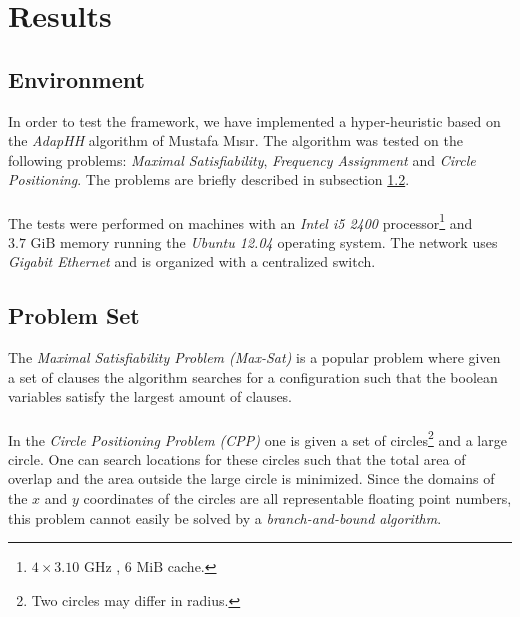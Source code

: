 \documentclass[a4paper,10pt]{article}
\newcommand{\seclab}[1]{\label{sec:#1}}
\newcommand{\ssclab}[1]{\label{ssc:#1}}
\newcommand{\sscref}[1]{\ref{ssc:#1}}
\theoremstyle{definition}
\begin{document}
\section{Results}
\seclab{results}

\subsection{Environment}
In order to test the framework, we have implemented a hyper-heuristic based on the \emph{AdapHH}\cite{} algorithm of Mustafa M\i{}s\i{}r. The algorithm was tested on the following problems: \emph{Maximal Satisfiability}, \emph{Frequency Assignment} and \emph{Circle Positioning}. The problems are briefly described in subsection \sscref{problemset}.%
\paragraph{}
The tests were performed on machines with an \emph{Intel i5 2400} processor\footnote{$4\times 3.10\mbox{ GHz}$ , $6\mbox{ MiB}$ cache.} and $3.7\mbox{ GiB}$ memory running the \emph{Ubuntu 12.04} operating system. The network uses \emph{Gigabit Ethernet} and is organized with a centralized switch.

\subsection{Problem Set}
\ssclab{problemset}
The \emph{Maximal Satisfiability Problem (Max-Sat)} is a popular problem where given a set of clauses the algorithm searches for a configuration such that the boolean variables satisfy the largest amount of clauses.

\paragraph{}
In the \emph{Circle Positioning Problem (CPP)} one is given a set of circles\footnote{Two circles may differ in radius.} and a large circle. One can search locations for these circles such that the total area of overlap and the area outside the large circle is minimized. Since the domains of the $x$ and $y$ coordinates of the circles are all representable floating point numbers, this problem cannot easily be solved by a \emph{branch-and-bound algorithm}.
\end{document}
